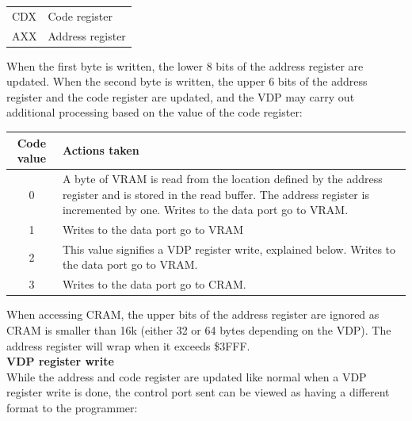 \documentclass{article}
\begin{document}
\begin{table}[H]
    \centering
    \begin{tabular}{l|l}
        \hline
        \hline
        CDX & Code register     \\
        AXX & Address register  \\
    \end{tabular}
\end{table}

When the first byte is written, the lower 8 bits of the address register are
updated. When the second byte is written, the upper 6 bits of the address
register and the code register are updated, and the VDP may carry out
additional processing based on the value of the code register:

\begin{table}[H]
    \centering
    \begin{tabular}{c|p{5in}}
        Code value      & Actions taken                                                 \\
        \hline
        \hline
            0           & A byte of VRAM is read from the location defined by
                        the address register and is stored in the read buffer.
                        The address register is incremented by one. Writes to
                        the data port go to VRAM.                                     \\
            1           & Writes to the data port go to VRAM                            \\
            2           & This value signifies a VDP register write, explained below.
                          Writes to the data port go to VRAM.                           \\
            3           & Writes to the data port go to CRAM.                           \\
    \end{tabular}
\end{table}


When accessing CRAM, the upper bits of the address register are ignored as CRAM
is smaller than 16k (either 32 or 64 bytes depending on the VDP). The address
register will wrap when it exceeds \$3FFF.                                      \\

\textbf{VDP register write}                                                     \\

While the address and code register are updated like normal when a VDP register
write is done, the control port sent can be viewed as having a different format
to the programmer:
\end{document}

